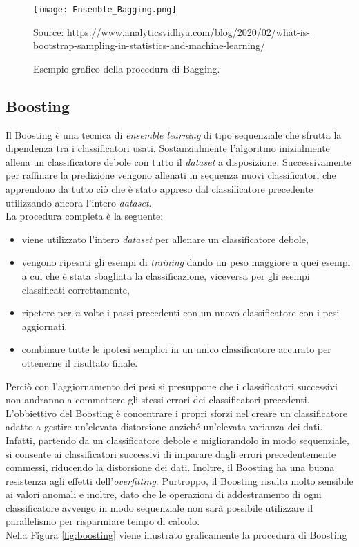 \begin{figure}[h]
	\begin{center}
		\texttt{[image: Ensemble\_Bagging.png]}
		\caption{Esempio grafico della procedura di Bagging.
		} 
		Source: \url{https://www.analyticsvidhya.com/blog/2020/02/what-is-bootstrap-sampling-in-statistics-and-machine-learning/}\label{fig:bagging}
	\end{center}
\end{figure}

\subsection{Boosting}
Il Boosting \autocite{freund1996experiments} è una tecnica di \emph{ensemble learning} di tipo sequenziale che sfrutta la dipendenza tra i classificatori usati. Sostanzialmente l'algoritmo inizialmente allena un classificatore debole con tutto il \emph{dataset} a disposizione. Successivamente per raffinare la predizione vengono allenati in sequenza nuovi classificatori che apprendono da tutto ciò che è stato appreso dal classificatore precedente utilizzando ancora l'intero \emph{dataset}.\\
La procedura completa è la seguente:
\begin{itemize}
	\item viene utilizzato l'intero \emph{dataset} per allenare un classificatore debole,
	\item vengono ripesati gli esempi di \emph{training} dando un peso maggiore a quei esempi a cui che è stata sbagliata la classificazione, viceversa per gli esempi classificati correttamente,
	\item ripetere per \emph{n} volte i passi precedenti con un nuovo classificatore con i pesi aggiornati,
	\item combinare tutte le ipotesi semplici in un unico classificatore accurato per ottenerne il risultato finale.
\end{itemize}
Perciò con l'aggiornamento dei pesi si presuppone che i classificatori successivi non andranno a commettere gli stessi errori dei classificatori precedenti.\\
L'obbiettivo del Boosting è concentrare i propri sforzi nel creare un classificatore adatto a gestire un'elevata distorsione anziché un'elevata varianza dei dati. Infatti, partendo da un classificatore debole e migliorandolo in modo sequenziale, si consente ai classificatori successivi di imparare dagli errori precedentemente commessi, riducendo la distorsione dei dati. Inoltre, il Boosting ha una buona resistenza agli effetti dell'\emph{overfitting}.
Purtroppo, il Boosting risulta molto sensibile ai valori anomali e inoltre, dato che le operazioni di addestramento di ogni classificatore avvengo in modo sequenziale non sarà possibile utilizzare il parallelismo per risparmiare tempo di calcolo.\\
Nella Figura \ref{fig:boosting} viene illustrato graficamente la procedura di Boosting

